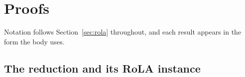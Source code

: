 \section{Proofs}
\label{apd:proofs}

Notation follows Section~\ref{sec:rola} throughout, and each result appears in the form the body uses.

\subsection{The reduction and its RoLA instance}

